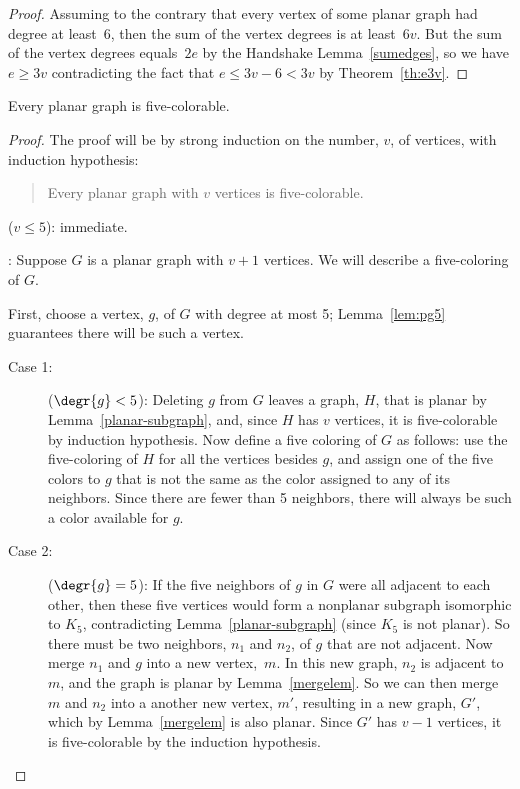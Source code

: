 \begin{proof}
Assuming to the contrary that every vertex of some planar graph had
degree at least~6, then the sum of the vertex degrees is at
least~$6v$.  But the sum of the vertex degrees equals~$2e$ by the
Handshake Lemma~\ref{sumedges}, so we have $e \ge 3v$ contradicting
the fact that $e \le 3v - 6 < 3v$ by Theorem~\ref{th:e3v}.
\end{proof}

\begin{theorem}
Every planar graph is five-colorable.
\end{theorem}

\begin{proof}
The proof will be by strong induction on the number, $v$, of vertices, with
induction hypothesis:
\begin{quote}
Every planar graph with $v$ vertices is five-colorable.
\end{quote}

 ($v \leq 5$): immediate.

: Suppose $G$ is a planar graph with
$v+1$ vertices.  We will describe a five-coloring of $G$.

First, choose a vertex, $g$, of $G$ with degree at most 5;
Lemma~\ref{lem:pg5} guarantees there will be such a vertex.
\begin{description}

\item[Case 1:] ($\degr{g}<5$): Deleting $g$ from $G$ leaves a graph,
$H$, that is planar by Lemma~\ref{planar-subgraph}, and, since $H$
has $v$ vertices, it is five-colorable by induction hypothesis.  Now
define a five coloring of $G$ as follows: use the five-coloring of $H$
for all the vertices besides $g$, and assign one of the five colors to
$g$ that is not the same as the color assigned to any of its
neighbors.  Since there are fewer than 5 neighbors, there will always
be such a color available for $g$.

\item[Case 2:] ($\degr{g}=5$): If the five neighbors of $g$ in $G$
  were all adjacent to each other, then these five vertices would form
  a nonplanar subgraph isomorphic to $K_5$, contradicting
  Lemma~\ref{planar-subgraph} (since $K_5$ is not planar).  So there
  must be two neighbors, $n_1$ and $n_2$, of $g$ that are not
  adjacent.  Now merge $n_1$ and $g$ into a new vertex,~$m$.  In this
  new graph, $n_2$ is adjacent to $m$, and the graph is planar by
  Lemma~\ref{mergelem}.  So we can then merge $m$ and $n_2$ into a
  another new vertex, $m'$, resulting in a new graph, $G'$, which by
  Lemma~\ref{mergelem} is also planar.  Since $G'$ has $v-1$
  vertices, it is five-colorable by the induction hypothesis.


\end{description}
\end{proof}
